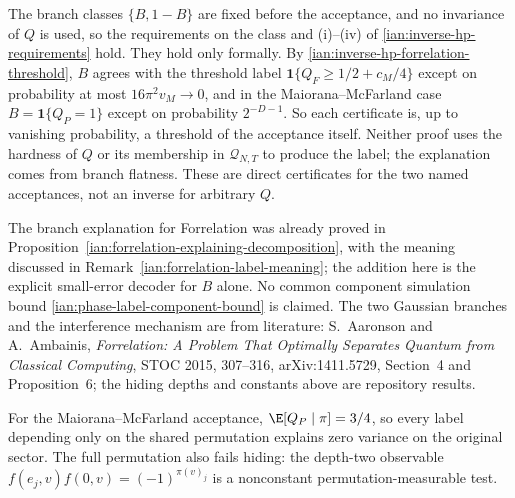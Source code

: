 \begin{remark}
\label{ian:inverse-hp-branch-scope}
The branch classes \(\{B,1-B\}\) are fixed before the acceptance, and no invariance of \(Q\) is used, so the requirements on the class and (i)--(iv) of \eqref{ian:inverse-hp-requirements} hold. They hold only formally. By \eqref{ian:inverse-hp-forrelation-threshold}, \(B\) agrees with the threshold label \(\mathbf1\{Q_F\ge1/2+c_M/4\}\) except on probability at most \(16\pi^2v_M\to0\), and in the Maiorana--McFarland case \(B=\mathbf1\{Q_P=1\}\) except on probability \(2^{-D-1}\). So each certificate is, up to vanishing probability, a threshold of the acceptance itself. Neither proof uses the hardness of \(Q\) or its membership in \(\mathcal Q_{N,T}\) to produce the label; the explanation comes from branch flatness. These are direct certificates for the two named acceptances, not an inverse for arbitrary \(Q\).

The branch explanation for Forrelation was already proved in Proposition~\ref{ian:forrelation-explaining-decomposition}, with the meaning discussed in Remark~\ref{ian:forrelation-label-meaning}; the addition here is the explicit small-error decoder for \(B\) alone. No common component simulation bound \eqref{ian:phase-label-component-bound} is claimed. The two Gaussian branches and the interference mechanism are from literature: S.~Aaronson and A.~Ambainis, \emph{Forrelation: A Problem That Optimally Separates Quantum from Classical Computing}, STOC 2015, 307--316, arXiv:1411.5729, Section~4 and Proposition~6; the hiding depths and constants above are repository results.
\end{remark}

\begin{remark}
\label{ian:inverse-hp-permutation}
For the Maiorana--McFarland acceptance, \(\E[Q_P\mid\pi]=3/4\), so every label depending only on the shared permutation explains zero variance on the original sector. The full permutation also fails hiding: the depth-two observable \(f(e_j,v)f(0,v)=(-1)^{\pi(v)_j}\) is a nonconstant permutation-measurable test.
\end{remark}

